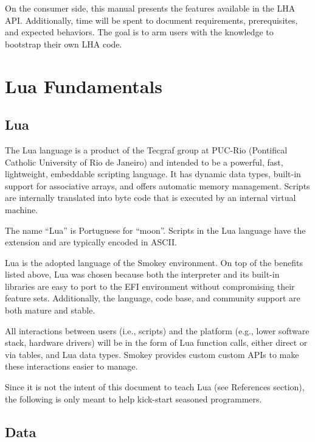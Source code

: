 On the consumer side, this manual presents the features available in the LHA
API.  Additionally, time will be spent to document requirements,
prerequisites, and expected behaviors.  The goal is to arm users with the
knowledge to bootstrap their own LHA code.



\section{Lua Fundamentals}

\subsection{Lua}

The Lua language is a product of the Tecgraf group at PUC-Rio (Pontifical
Catholic University of Rio de Janeiro) and intended to be a powerful, fast,
lightweight, embeddable scripting language.  It has dynamic data types,
built-in support for associative arrays, and offers automatic memory
management.  Scripts are internally translated into byte code that is executed
by an internal virtual machine.

The name ``Lua'' is Portuguese for ``moon''.  Scripts in the Lua language have
the extension  and are typically encoded in ASCII.

Lua is the adopted language of the Smokey environment.  On top of the benefits
listed above, Lua was chosen because both the interpreter and its built-in
libraries are easy to port to the EFI environment without compromising their
feature sets.  Additionally, the language, code base, and community support are
both mature and stable.

All interactions between users (i.e., scripts) and the platform (e.g., lower
software stack, hardware drivers) will be in the form of Lua function calls,
either direct or via tables, and Lua  data types.  Smokey provides custom
custom APIs to make these interactions easier to manage.

Since it is not the intent of this document to teach Lua (see References
section), the following is only meant to help kick-start seasoned programmers.

\subsection{Data}

